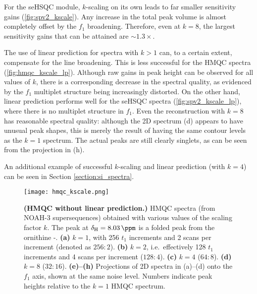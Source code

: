 For the seHSQC module, $k$-scaling on its own leads to far smaller sensitivity gains (\cref{fig:spv2_kscale}).
Any increase in the total peak volume is almost completely offset by the $f_1$ broadening.
Therefore, even at $k = 8$, the largest sensitivity gains that can be attained are $\sim 1.3\times$.

The use of linear prediction for spectra with $k > 1$ can, to a certain extent, compensate for the line broadening.
This is less successful for the HMQC spectra (\cref{fig:hmqc_kscale_lp}).
Although raw gains in peak height can be observed for all values of $k$, there is a corresponding decrease in the spectral quality, as evidenced by the $f_1$ multiplet structure being increasingly distorted.
On the other hand, linear prediction performs well for the seHSQC spectra (\cref{fig:spv2_kscale_lp}), where there is no multiplet structure in $f_1$.
Even the reconstruction with $k = 8$ has reasonable spectral quality: although the 2D spectrum (d) appears to have unusual peak shapes, this is merely the result of having the same contour levels as the $k = 1$ spectrum.
The actual peaks are still clearly singlets, as can be seen from the projection in (h).

An additional example of successful $k$-scaling and linear prediction (with $k = 4$) can be seen in Section \ref{section:si_spectra}.

\begin{figure}
    \centering
    \texttt{[image: hmqc\_kscale.png]}
    \caption{
        \textbf{(HMQC without linear prediction.)}
        \nitrogen{} HMQC spectra (from NOAH-3  supersequences) obtained with various values of the scaling factor $k$.
        The peak at $\delta_{\ce{H}} = \SI{8.03}{\ppm}$ is a folded peak from the ornithine \textdelta-.
        \textbf{(a)} $k = 1$, with 256 $t_1$ increments and 2 scans per increment (denoted as $256:2$).
        \textbf{(b)} $k = 2$, i.e.\ effectively 128 $t_1$ increments and 4 scans per increment ($128:4$).
        \textbf{(c)} $k = 4$ ($64:8$).
        \textbf{(d)} $k = 8$ ($32:16$).
        \textbf{(e)--(h)} Projections of 2D spectra in (a)--(d) onto the $f_1$ axis, shown at the same noise level.
        Numbers indicate peak heights relative to the $k = 1$ HMQC spectrum.
        \grami{}
    }
    \label{fig:hmqc_kscale}
\end{figure}


